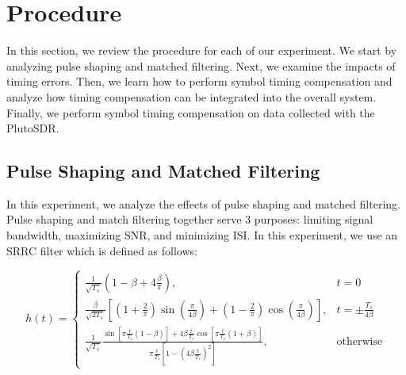 \documentclass{article}
\begin{document}


\section{Procedure}

In this section, we review the procedure for each of our experiment. We start by analyzing pulse shaping and matched filtering. Next, we examine the impacts of timing errors. Then, we learn how to perform symbol timing compensation and analyze how timing compensation can be integrated into the overall system. Finally, we perform symbol timing compensation on data collected with the PlutoSDR.

\subsection{Pulse Shaping and Matched Filtering}

In this experiment, we analyze the effects of pulse shaping and matched filtering. Pulse shaping and match filtering together serve 3 purposes: limiting signal bandwidth, maximizing SNR, and minimizing ISI. In this experiment, we use an SRRC filter which is defined as follows:

\begin{equation}
	h(t) = \begin{cases}
		\frac{1}{\sqrt{T_s}}\left(1 - \beta + 4\frac{\beta}{\pi}\right), & t = 0 \\
		\frac{\beta}{\sqrt{2T_s}}\left[\left(1 + \frac{2}{\pi}\right)\sin\left(\frac{\pi}{4\beta}\right)+ \left(1-\frac{2}{\pi}\right)\cos\left(\frac{\pi}{4\beta}\right)\right], & t = \pm\frac{T_s}{4\beta} \\
		\frac{1}{\sqrt{T_s}}\frac{\sin\left[\pi\frac{t}{T_s}(1-\beta)\right]+4\beta\frac{t}{T_s}\cos\left[\pi\frac{t}{T_s}(1+\beta)\right]}{\pi\frac{t}{T_s}\left[1 - \left(4\beta\frac{t}{T_s}\right)^2\right]}, & \text{otherwise}
	\end{cases}
	\label{eq::srrc_filter}
\end{equation}
\end{document}

